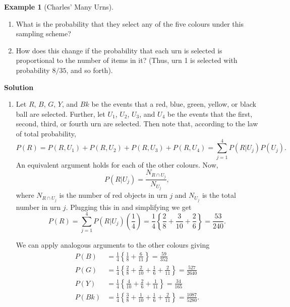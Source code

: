 \documentclass[
  letterpaper,
  DIV=11,
  numbers=noendperiod]{scrreprt}
\providecommand{\tightlist}{%
  \setlength{\itemsep}{0pt}\setlength{\parskip}{0pt}}\usepackage{longtable,booktabs,array}
\theoremstyle{definition}
\theoremstyle{definition}
\newtheorem{example}{Example}[chapter]
\theoremstyle{definition}
\theoremstyle{remark}
\begin{document}
\begin{example}[Charles' Many
Urns]
\begin{enumerate}
\def\labelenumi{\alph{enumi}.}
\tightlist
\item
  What is the probability that they select any of the five colours under
  this sampling scheme?
\item
  How does this change if the probability that each urn is selected is
  proportional to the number of items in it? (Thus, urn 1 is selected
  with probability \(8/35\), and so forth).
\end{enumerate}

\begin{tcolorbox}[enhanced jigsaw, colback=white, colframe=quarto-callout-color-frame, arc=.35mm, leftrule=.75mm, rightrule=.15mm, opacityback=0, breakable, bottomrule=.15mm, left=2mm, toprule=.15mm]

\vspace{-3mm}\textbf{Solution}\vspace{3mm}

\begin{enumerate}
\def\labelenumi{\alph{enumi}.}
\item
  Let \(R\), \(B\), \(G\), \(Y\), and \(Bk\) be the events that a red,
  blue, green, yellow, or black ball are selected. Further, let \(U_1\),
  \(U_2\), \(U_3\), and \(U_4\) be the events that the first, second,
  third, or fourth urn are selected. Then note that, according to the
  law of total probability,
  \[P(R) = P(R, U_1) + P(R, U_2) + P(R, U_3) + P(R, U_4) = \sum_{j=1}^4 P(R|U_j)P(U_j).\]
  An equivalent argument holds for each of the other colours. Now,
  \[P(R|U_j) = \frac{N_{R\cap U_j}}{N_{U_j}},\] where \(N_{R\cap U_j}\)
  is the number of red objects in urn \(j\) and \(N_{U_j}\) is the total
  number in urn \(j\). Plugging this in and simplifying we get
  \[P(R) = \sum_{j=1}^4P(R|U_j)\left(\frac{1}{4}\right) = \frac{1}{4}\left\{\frac{2}{8} + \frac{3}{10} + \frac{2}{6}\right\} = \frac{53}{240}.\]

  We can apply analogous arguments to the other colours giving
  \begin{align*}
  P(B) &= \frac{1}{4}\left\{\frac{1}{8} + \frac{6}{11}\right\} = \frac{59}{352} \\
  P(G) &= \frac{1}{4}\left\{\frac{2}{8} + \frac{2}{10} + \frac{1}{6} + \frac{2}{11}\right\} = \frac{527}{2640}\\
  P(Y) &= \frac{1}{4}\left\{\frac{4}{10} + \frac{2}{6} + \frac{1}{11}\right\} = \frac{34}{165}\\
  P(Bk) &= \frac{1}{4}\left\{\frac{3}{8} + \frac{1}{10} + \frac{1}{6} + \frac{2}{11}\right\} = \frac{1087}{5280}.
  \end{align*}


\end{enumerate}
\end{tcolorbox}
\end{example}
\end{document}
